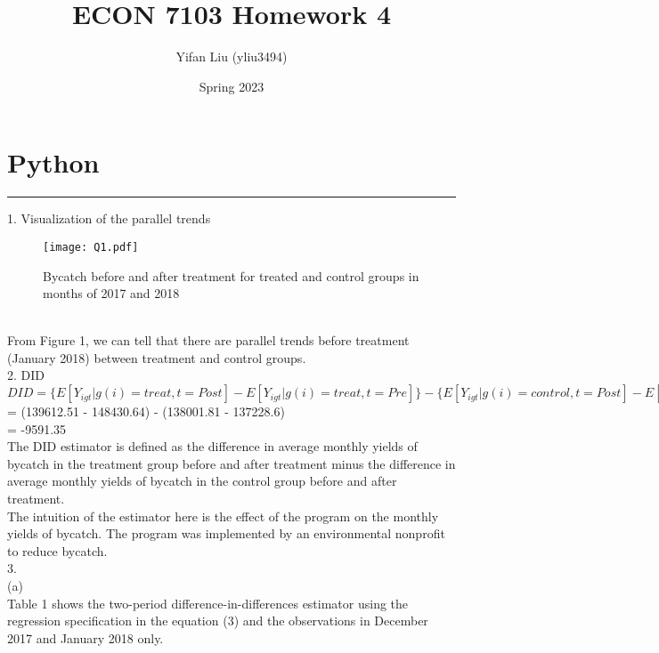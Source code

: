 \documentclass{article}
\title{ECON 7103 Homework 4}
\author{Yifan Liu (yliu3494)}
\date{Spring 2023}
\begin{document}
  
\maketitle



\noindent
\section{Python}
\noindent\rule{17cm}{0.4pt}
1. Visualization of the parallel trends
\begin{figure}[h]
    \centering
    \texttt{[image: Q1.pdf]}
    \caption{Bycatch before and after treatment for treated and control groups in months of 2017 and 2018}
    \label{fig:Q1}
\end{figure}
\\
From Figure 1, we can tell that there are parallel trends before treatment (January 2018) between treatment and control groups. 
\bigskip
\\
2. DID
\bigskip
\\
$DID = \{E[Y_{igt}| g(i) = treat, t= Post] - E[Y_{igt}| g(i) = treat, t= Pre]\} - \{E[Y_{igt}| g(i) = control, t= Post] - E[Y_{igt}| g(i) = control, t= Pre]\}$
\smallskip
\\
= (139612.51 - 148430.64) - (138001.81 - 137228.6)
\smallskip
\\
= -9591.35
\smallskip
\\
The DID estimator is defined as the difference in average monthly yields of bycatch in the treatment group before and after treatment minus the difference in average monthly yields of bycatch in the control group before and after treatment.
\\
The intuition of the estimator here is the effect of the program  on the monthly yields of bycatch. The program was implemented by an environmental nonprofit to reduce bycatch. 
\bigskip
\\
3. 
\bigskip
\\
(a)
\smallskip
\\
Table 1 shows the two-period difference-in-differences estimator using the regression specification in the equation (3) and the observations in December 2017 and January 2018 only.
\begin{table}[h]
    \centering
    
    \caption{Two-period difference-in-differences estimator using the regression specification in the equation (3)}
    \label{tab:Q3_a}
\end{table}
\bigskip
\\
\end{document}
